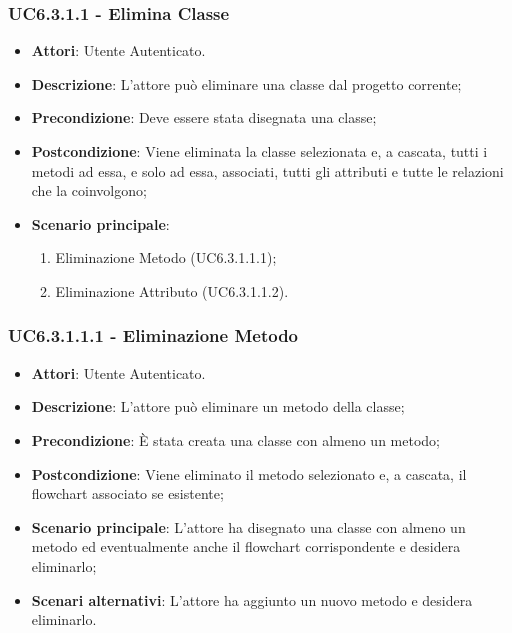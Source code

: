 \subsubsection{UC6.3.1.1 - Elimina Classe} 
\label{sssec:UC6.3.1.1} 
\begin{itemize} 
\item \textbf{Attori}: Utente Autenticato.
\item \textbf{Descrizione}: L'attore può eliminare una classe dal progetto corrente;
\item \textbf{Precondizione}: Deve essere stata disegnata una classe;
\item \textbf{Postcondizione}: Viene eliminata la classe selezionata e, a cascata, tutti i metodi ad essa, e solo ad essa, associati, tutti gli attributi e tutte le relazioni che la coinvolgono;
\item \textbf{Scenario principale}: \begin{enumerate}\item Eliminazione Metodo (UC6.3.1.1.1);\item Eliminazione Attributo (UC6.3.1.1.2). 
 \end{enumerate}
\end{itemize} 
\subsubsection{UC6.3.1.1.1 - Eliminazione Metodo} 
\label{sssec:UC6.3.1.1.1} 
\begin{itemize} 
\item \textbf{Attori}: Utente Autenticato.
\item \textbf{Descrizione}: L'attore può eliminare un metodo della classe;
\item \textbf{Precondizione}: È stata creata una classe con almeno un metodo;
\item \textbf{Postcondizione}: Viene eliminato il metodo selezionato e, a cascata, il flowchart associato se esistente;
\item \textbf{Scenario principale}: L'attore ha disegnato una classe con almeno un metodo ed  eventualmente anche il flowchart corrispondente e desidera eliminarlo;\item \textbf{Scenari alternativi}: L'attore ha aggiunto un nuovo metodo e desidera eliminarlo.
\end{itemize} 
